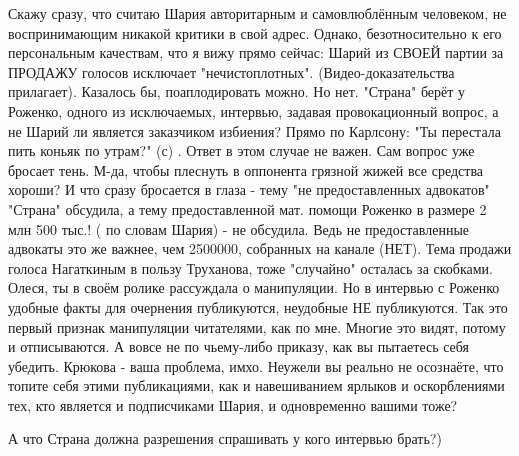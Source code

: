 \begin{itemize}
 

Скажу сразу, что считаю Шария авторитарным и самовлюблённым человеком, не
воспринимающим никакой критики в свой адрес. Однако, безотносительно к его
персональным качествам, что я вижу прямо сейчас: Шарий из СВОЕЙ партии за
ПРОДАЖУ голосов исключает "нечистоплотных". (Видео-доказательства прилагает).
Казалось бы, поаплодировать можно. Но нет. "Страна" берёт у Роженко, одного из
исключаемых, интервью, задавая провокационный вопрос, а не Шарий ли является
заказчиком избиения? Прямо по Карлсону: "Ты перестала пить коньяк по утрам?"
(с) . Ответ в этом случае не важен. Сам вопрос уже бросает тень. М-да, чтобы
плеснуть в оппонента грязной жижей все средства хороши? И что сразу бросается в
глаза - тему "не предоставленных адвокатов" "Страна" обсудила, а тему
предоставленной мат. помощи Роженко в размере 2 млн 500 тыс.! ( по словам
Шария) - не обсудила. Ведь не предоставленные адвокаты это же важнее, чем
2500000, собранных на канале (НЕТ). Тема продажи голоса Нагаткиным в пользу
Труханова, тоже "случайно" осталась за скобками. Олеся, ты в своём ролике
рассуждала о манипуляции. Но в интервью с Роженко удобные факты для очернения
публикуются, неудобные НЕ публикуются. Так это первый признак манипуляции
читателями, как по мне. Многие это видят, потому и отписываются. А вовсе не по
чьему-либо приказу, как вы пытаетесь себя убедить. Крюкова - ваша проблема,
имхо. Неужели вы реально не осознаёте, что топите себя этими публикациями, как
и навешиванием ярлыков и оскорблениями тех, кто является и подписчиками Шария,
и одновременно вашими тоже?

\begin{itemize}
 
А что Страна должна разрешения спрашивать у кого интервью брать?)

 

\end{itemize}
\end{itemize}
